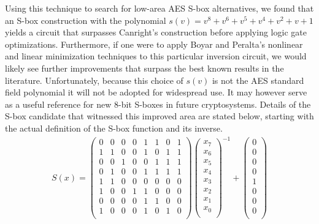 Using this technique to search for low-area AES S-box alternatives, we found that an S-box construction with the polynomial $s(v) = v^8 + v^6 + v^5 + v^4 + v^2 + v + 1$ yields a circuit that surpasses Canright's construction before applying logic gate optimizations. Furthermore, if one were to apply Boyar and Peralta's nonlinear and linear minimization techniques to this particular inversion circuit, we would likely see further improvements that surpass the best known results in the literature. Unfortunately, because this choice of $s(v)$ is not the AES standard field polynomial it will not be adopted for widespread use. It may however serve as a useful reference for new 8-bit S-boxes in future cryptosystems. Details of the S-box candidate that witnessed this improved area are stated below, starting with the actual definition of the S-box function and its inverse.
\begin{align*}
S(x) =  
\begin{pmatrix}
0 & 0 & 0 & 0 & 1 & 1 & 0 & 1 \\
1 & 1 & 0 & 0 & 1 & 0 & 1 & 1 \\
0 & 0 & 1 & 0 & 0 & 1 & 1 & 1 \\
0 & 1 & 0 & 0 & 1 & 1 & 1 & 1 \\
1 & 1 & 0 & 0 & 0 & 0 & 0 & 0 \\
1 & 0 & 0 & 1 & 1 & 0 & 0 & 0 \\
0 & 0 & 0 & 0 & 1 & 1 & 0 & 0 \\
1 & 0 & 0 & 0 & 1 & 0 & 1 & 0 \\
\end{pmatrix}
\begin{pmatrix}
x_7 \\
x_6 \\
x_5 \\
x_4 \\
x_3 \\ 
x_2 \\
x_1 \\
x_0 \\
\end{pmatrix}^{-1}
+
\begin{pmatrix}
0 \\
0 \\
0 \\
0 \\
1 \\ 
0 \\
0 \\
0 \\
\end{pmatrix}
\end{align*}
